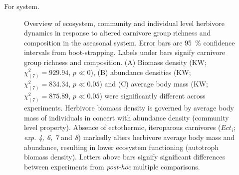 For   system. 

\begin{figure}
\centering

\caption[Ecosystem, community and individual level response to altered carnivore group richness and composition in the aseasonal system]{Overview of ecosystem, community and individual level herbivore dynamics in response to altered carnivore group richness and composition in the aseasonal system. Error bars are 95~\% confidence intervals from boot-strapping. Labels under bars signify carnivore group richness and composition. (A) Biomass density (KW; $\chi^{2}_{(7)} = 929.94$, $p \ll 0$), (B) abundance densities (KW; $\chi^{2}_{(7)} = 834.34$, $p \ll 0.05$) and (C) average body mass (KW; $\chi^{2}_{(7)} = 875.89$, $p \ll 0.05$) were significantly different across experiments. Herbivore biomass density is governed by average body mass of individuals in concert with abundance density (community level property). Absence of ectothermic, iteroparous carnivores ($Ect_i$; \textit{exp. 4, 6, 7} and \textit{8}) markedly alters herbivore average body mass and abundance, resulting in lower ecosystem functioning (autotroph biomass density). Letters above bars signify significant differences between experiments from \textit{post-hoc} multiple comparisons. }
\label{fig:chap:res:dyn:cell0}
\end{figure}




%


